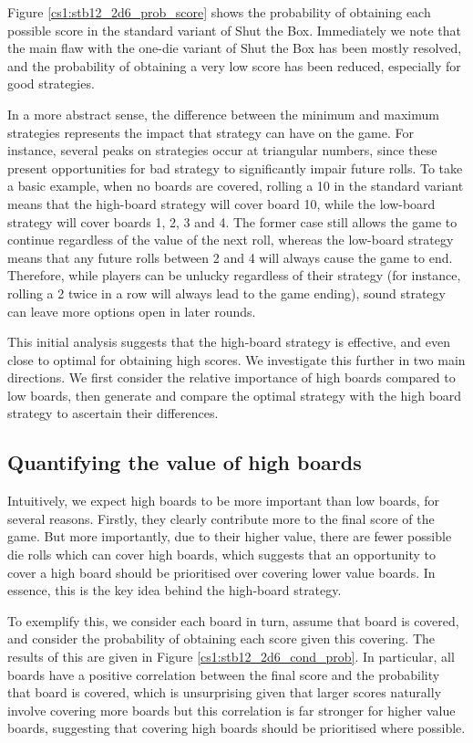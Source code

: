 Figure \ref{cs1:stb12_2d6_prob_score} shows the probability of obtaining each possible score in the standard variant of Shut the Box. Immediately we note that the main flaw with the one-die variant of Shut the Box has been mostly resolved, and the probability of obtaining a very low score has been reduced, especially for good strategies. 

In a more abstract sense, the difference between the minimum and maximum strategies represents the impact that strategy can have on the game. For instance, several peaks on strategies occur at triangular numbers, since these present opportunities for bad strategy to significantly impair future rolls. To take a basic example, when no boards are covered, rolling a 10 in the standard variant means that the high-board strategy will cover board 10, while the low-board strategy will cover boards 1, 2, 3 and 4. The former case still allows the game to continue regardless of the value of the next roll, whereas the low-board strategy means that any future rolls between 2 and 4 will always cause the game to end. Therefore, while players can be unlucky regardless of their strategy (for instance, rolling a 2 twice in a row will always lead to the game ending), sound strategy can leave more options open in later rounds.


This initial analysis suggests that the high-board strategy is effective, and even close to optimal for obtaining high scores. We investigate this further in two main directions. We first consider the relative importance of high boards compared to low boards, then generate and compare the optimal strategy with the high board strategy to ascertain their differences.

\subsection{Quantifying the value of high boards}

Intuitively, we expect high boards to be more important than low boards, for several reasons. Firstly, they clearly contribute more to the final score of the game. But more importantly, due to their higher value, there are fewer possible die rolls which can cover high boards, which suggests that an opportunity to cover a high board should be prioritised over covering lower value boards. In essence, this is the key idea behind the high-board strategy. 

To exemplify this, we consider each board in turn, assume that board is covered, and consider the probability of obtaining each score given this covering. The results of this are given in Figure \ref{cs1:stb12_2d6_cond_prob}. In particular, all boards have a positive correlation between the final score and the probability that board is covered, which is unsurprising given that larger scores naturally involve covering more boards but this correlation is far stronger for higher value boards, suggesting that covering high boards should be prioritised where possible.

